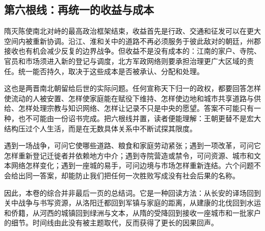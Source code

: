 \subsection{第六根线：再统一的收益与成本}

隋灭陈使南北对峙的最高政治框架结束，收益首先是行政、交通和征发可以在更大空间内被重新协调。沿江、淮和关中的道路不再必须服务于彼此敌对的朝廷，州郡接收也有机会减少反复的边界战争。但收益不是没有成本的：江南的家户、寺院、官员和市场须进入新的登记与调度，北方军政网络则要承担治理更广大区域的责任。统一能否持久，取决于这些成本是否被承认、分配和处理。

这也是两晋南北朝留给后世的实际问题。任何宣称天下归一的政权，都要回答怎样使流动的人被安置、怎样使家庭能在赋役下维持、怎样使边地和城市共享道路与供给、怎样处理宗教与知识网络、怎样让记录不只是中央的愿望。答案不可能只有一种，也不可能由一份诏书完成。把六根线并置，读者便能理解：王朝更替不是宏大结构压过个人生活，而是在无数具体关系中不断试探其限度。

\begin{causalchain}
遇到一场战争，可问它使哪些道路、粮食和家庭劳动紧张；遇到一项改革，可问它怎样重新登记迁徙者并依赖地方中介；遇到寺院营造或禁令，可问资源、城市和文本网络怎样变化；遇到一座城的易手，可问边境与市场怎样重新连结。六个问题不会给出同一答案，却能防止我们把任何一次胜败写成没有社会后果的名称。
\end{causalchain}

因此，本卷的综合并非最后一页的总结词。它是一种回读方法：从长安的译场回到关中战争与书写资源，从洛阳迁都回到军镇与家庭的距离，从建康的北伐回到水运和侨籍，从河西的城镇回到绿洲与文本，从隋的受降回到接收一座城市和一批家户的细节。时间线由此没有被主题取代，反而获得了更长的因果回声。
